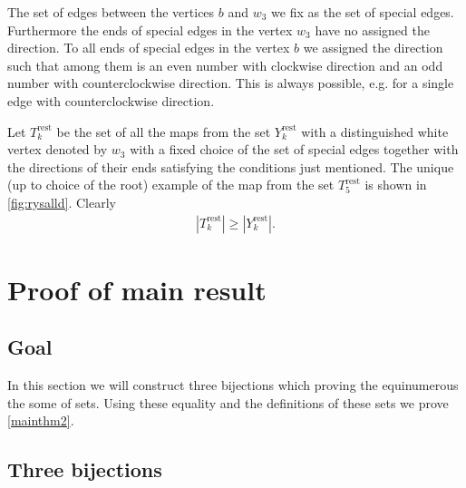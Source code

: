 \documentclass[submission]{FPSAC2021}
\DeclareMathOperator{\rest}{rest}
\begin{document}
The set of edges between the vertices $b$ 
and $w_3$ we fix as the set of special edges.
Furthermore the ends of special edges in the
vertex $w_3$ have no assigned the direction. 
To all ends of special edges in the vertex 
$b$ we assigned the direction such that among 
them is an even number with clockwise direction 
and an odd number with counterclockwise direction.
This is always possible, e.g. for a single edge 
with counterclockwise direction.

Let $T_k^{\rest}$ be the set of all the 
maps from the set $Y_k^{\rest}$ with a 
distinguished white vertex denoted by $w_3$ 
with a fixed choice of the set of special 
edges together with the directions of their 
ends satisfying the conditions just mentioned. 
The unique (up to choice of the root) example 
of the map from the set $T_{5}^{\rest}$ is 
shown in \cref{fig:rysalld}. Clearly
\begin{align}
\label{ineqrest}
|T_{k}^{\rest}| \geq |Y_{k}^{\rest}|.
\end{align}


\section{Proof of main result}

\subsection{Goal}

In this section we will construct three bijections which proving the equinumerous the some of sets. Using these equality and the definitions of these sets we prove \cref{mainthm2}.

\subsection{Three bijections}
\end{document}
